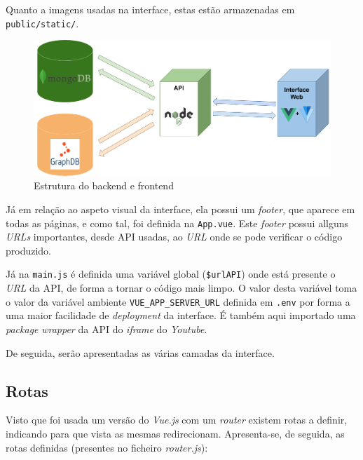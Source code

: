 \documentclass{article}
\begin{document}
Quanto a imagens usadas na interface, estas estão armazenadas em \texttt{public/static/}.

\begin{figure}[H]
    \centering
    \includegraphics[width=12cm]{Pictures/backend_frontend.png}
    \caption{Estrutura do backend e frontend}
    \label{backend_frontend}
\end{figure}

Já em relação ao aspeto visual da interface, ela possui um \textit{footer}, que aparece em todas as páginas, e como tal, foi definida na \texttt{App.vue}. Este \textit{footer} possui allguns \textit{URLs} importantes, desde API usadas, ao \textit{URL} onde se pode verificar o código produzido.

Já na \texttt{main.js} é definida uma variável global (\texttt{\$urlAPI}) onde está presente o \textit{URL} da API, de forma a tornar o código mais limpo. O valor desta variável toma o valor da variável ambiente \texttt{VUE\_APP\_SERVER\_URL} definida em \texttt{.env} por forma a uma maior facilidade de \textit{deployment} da interface. É também aqui importado uma \textit{package} \textit{wrapper} da API do \textit{iframe} do \textit{Youtube}.

De seguida, serão apresentadas as várias camadas da interface.

\subsection{Rotas}

Visto que foi usada um versão do \textit{Vue.js} com um \textit{router} existem rotas a definir, indicando para que vista as mesmas redirecionam. Apresenta-se, de seguida, as rotas definidas (presentes no ficheiro \textit{router.js}):
\end{document}
